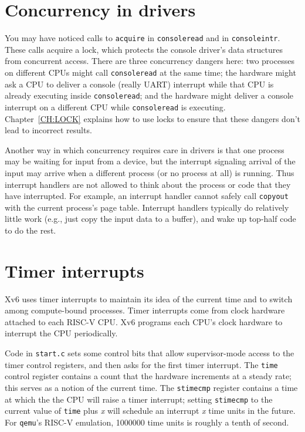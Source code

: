 \section{Concurrency in drivers}

You may have noticed calls to {\tt acquire} in {\tt consoleread}
and in {\tt consoleintr}. These calls acquire a lock, which protects
the console driver's data structures from concurrent access.
There are three concurrency dangers here: two processes on
different CPUs might call {\tt consoleread} at the same time;
the hardware might ask a CPU to deliver a console (really 
UART) interrupt while that CPU is already executing inside
{\tt consoleread};
and the hardware might deliver a console interrupt on
a different CPU while {\tt consoleread} is executing.
Chapter~\ref{CH:LOCK} explains how to use locks
to ensure that these dangers don't lead to incorrect results.

Another way in which concurrency requires care in drivers is that one
process may be waiting for input from a device, but the interrupt
signaling arrival of the input may arrive when a different process (or
no process at all) is running. Thus interrupt handlers are not allowed
to think about the process or code that they have interrupted. For
example, an interrupt handler cannot safely call {\tt copyout} with
the current process's page table. Interrupt handlers typically do
relatively little work (e.g., just copy the input data to a buffer),
and wake up top-half code to do the rest.

\section{Timer interrupts}

Xv6 uses timer interrupts to maintain its idea of the
current time and to switch among compute-bound processes. Timer
interrupts come from clock hardware attached to each RISC-V CPU. Xv6
programs each CPU's clock hardware to interrupt the CPU periodically.

Code in {\tt start.c} 
 sets some control bits
that allow supervisor-mode access to the timer control
registers, and then asks for the first timer interrupt.
The {\tt time} control register contains a count that the
hardware increments at a steady rate; this serves as a
notion of the current time. The {\tt stimecmp} register
contains a time at which the the CPU will raise a timer
interrupt; setting {\tt stimecmp} to the current value
of {\tt time} plus {\it x} will schedule an interrupt
{\it x} time units in the future. For {\tt qemu}'s RISC-V
emulation, 1000000 time units is roughly a tenth of second.

